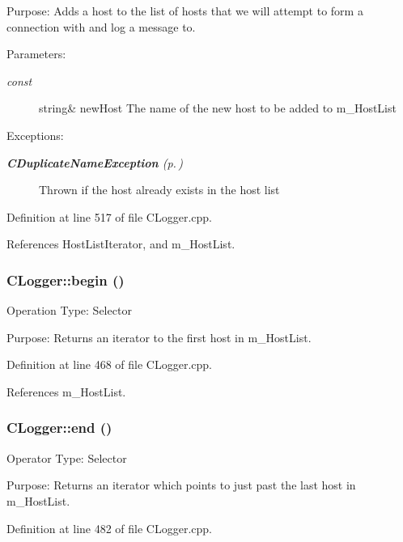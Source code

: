 Purpose: Adds a host to the list of hosts that we will attempt to form a connection with and log a message to.\begin{Desc}
\item[Parameters: ]\par
\begin{description}
\item[{\em 
const}]string\& new\-Host The name of the new host to be  added to m\_\-Host\-List\end{description}
\end{Desc}
\begin{Desc}
\item[Exceptions: ]\par
\begin{description}
\item[{\em 
{\bf CDuplicate\-Name\-Exception} {\rm (p.\,\pageref{classCDuplicateNameException})}}] Thrown if the host already  exists in the host list \end{description}
\end{Desc}


Definition at line 517 of file CLogger.cpp.

References Host\-List\-Iterator, and m\_\-Host\-List.
\subsubsection{ CLogger::begin ()}\label{classCLogger_a4}


Operation Type: Selector

Purpose: Returns an iterator to the first host in m\_\-Host\-List. 

Definition at line 468 of file CLogger.cpp.

References m\_\-Host\-List.
\subsubsection{ CLogger::end ()}\label{classCLogger_a5}


Operator Type: Selector

Purpose: Returns an iterator which points to just past the last host in m\_\-Host\-List. 

Definition at line 482 of file CLogger.cpp.

